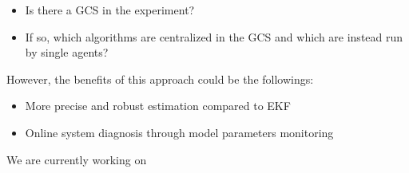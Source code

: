 \begin{itemize}
    \item Is there a GCS in the experiment?
    \item If so, which algorithms are centralized in the GCS and which are instead run by single agents?    
\end{itemize}

However, the benefits of this approach could be the followings:

\begin{itemize}
    \item More precise and robust estimation compared to EKF
    \item Online system diagnosis through model parameters monitoring
\end{itemize}

\newline
We are currently working on 

